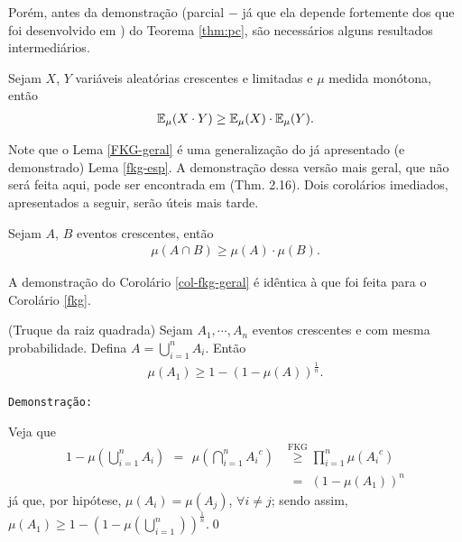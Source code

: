 Porém, antes da demonstração (parcial $-$ já que ela depende fortemente dos que foi desenvolvido em \cite{duminil2019sharpdecisiontree}) do Teorema \ref{thm:pc}, são necessários alguns resultados intermediários.

\begin{mylem} \label{FKG-geral}
	Sejam $X$, $Y$ variáveis aleatórias crescentes e limitadas e $\mu$ medida monótona, então
	\begin{align*}
		\operatorname{\mathbb{E}}_{\mu}(X \cdot Y) \geq \operatorname{\mathbb{E}}_{\mu}(X) \cdot \operatorname{\mathbb{E}}_{\mu}(Y). 
	\end{align*}
\end{mylem}

Note que o Lema \ref{FKG-geral} é uma generalização do já apresentado (e demonstrado) Lema \ref{fkg-esp}. A demonstração dessa versão mais geral, que não será feita aqui, pode ser encontrada em \cite{grimmett2004random} (Thm. 2.16). Dois corolários imediados, apresentados a seguir, serão úteis mais tarde.

\begin{mycol} \label{col-fkg-geral}
	Sejam $A$, $B$ eventos crescentes, então
	\begin{align*}
	\mu(A \cap B) \geq \mu(A) \cdot \mu(B).
	\end{align*}
\end{mycol}

A demonstração do Corolário \ref{col-fkg-geral} é idêntica à que foi feita para o Corolário \ref{fkg}.

\begin{mycol}(Truque da raiz quadrada) \label{col-trq}
	Sejam $A_1, \cdots, A_n$ eventos crescentes e com mesma probabilidade. Defina $A = \bigcup_{i=1}^{n}A_i$. Então
	\begin{align*}
		\mu(A_1) \geq 1 - (1 - \mu(A))^{\frac{1}{n}}.
	\end{align*}
\end{mycol}

\texttt{Demonstração:}

Veja que
\begin{align*}
	1 - \mu\left(\bigcup_{i = 1}^n A_i\right) \overset{\phantom{\text{FKG}}}{=} \mu\left(\bigcap_{i=1}^n {A_i}^c\right) &\overset{\text{FKG}}{\geq} \prod_{i=1}^n \mu\left({A_i}^c\right) \\
			   &\overset{\phantom{\text{FKG}}}{=} \left(1 - \mu(A_1)\right)^n
\end{align*}
já que, por hipótese, $\mu(A_i) = \mu(A_j)$, $\forall i \neq j$; sendo assim, $\mu(A_1) \geq 1 - (1 - \mu\left(\bigcup_{i = 1}^n\right))^{\frac{1}{n}}$.\hspace{\fill}\qed

